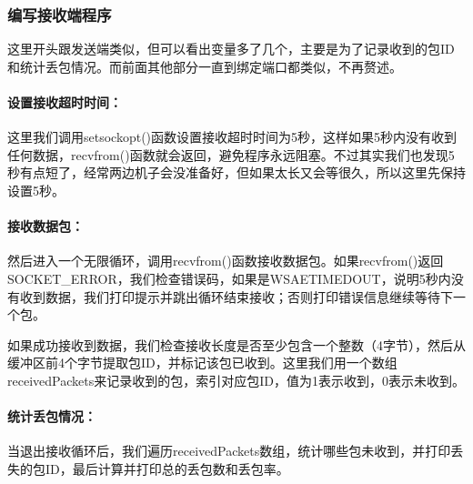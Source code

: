 \documentclass[a4paper]{article}
\begin{document}
\subsubsection{编写接收端程序}

这里开头跟发送端类似，但可以看出变量多了几个，主要是为了记录收到的包ID和统计丢包情况。而前面其他部分一直到绑定端口都类似，不再赘述。

\paragraph{设置接收超时时间：}这里我们调用setsockopt()函数设置接收超时时间为5秒，这样如果5秒内没有收到任何数据，recvfrom()函数就会返回，避免程序永远阻塞。不过其实我们也发现5秒有点短了，经常两边机子会没准备好，但如果太长又会等很久，所以这里先保持设置5秒。

\paragraph{接收数据包：}然后进入一个无限循环，调用recvfrom()函数接收数据包。如果recvfrom()返回SOCKET\_ERROR，我们检查错误码，如果是WSAETIMEDOUT，说明5秒内没有收到数据，我们打印提示并跳出循环结束接收；否则打印错误信息继续等待下一个包。

如果成功接收到数据，我们检查接收长度是否至少包含一个整数（4字节），然后从缓冲区前4个字节提取包ID，并标记该包已收到。这里我们用一个数组receivedPackets来记录收到的包，索引对应包ID，值为1表示收到，0表示未收到。

\paragraph{统计丢包情况：}当退出接收循环后，我们遍历receivedPackets数组，统计哪些包未收到，并打印丢失的包ID，最后计算并打印总的丢包数和丢包率。
\end{document}

